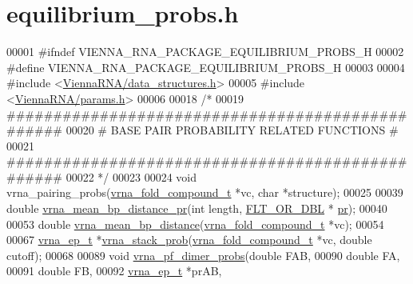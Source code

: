 \hypertarget{equilibrium__probs_8h_source}{}\section{equilibrium\+\_\+probs.\+h}
\label{equilibrium__probs_8h_source}

\begin{DoxyCode}
00001 \textcolor{preprocessor}{#ifndef VIENNA\_RNA\_PACKAGE\_EQUILIBRIUM\_PROBS\_H}
00002 \textcolor{preprocessor}{#define VIENNA\_RNA\_PACKAGE\_EQUILIBRIUM\_PROBS\_H}
00003 
00004 \textcolor{preprocessor}{#include <\hyperlink{data__structures_8h}{ViennaRNA/data\_structures.h}>}
00005 \textcolor{preprocessor}{#include <\hyperlink{params_8h}{ViennaRNA/params.h}>}
00006 
00018 \textcolor{comment}{/*}
00019 \textcolor{comment}{#################################################}
00020 \textcolor{comment}{# BASE PAIR PROBABILITY RELATED FUNCTIONS       #}
00021 \textcolor{comment}{#################################################}
00022 \textcolor{comment}{*/}
00023 
00024 \textcolor{keywordtype}{void}  vrna\_pairing\_probs(\hyperlink{group__fold__compound_structvrna__fc__s}{vrna\_fold\_compound\_t} *vc, \textcolor{keywordtype}{char} *structure);
00025 
00039 \textcolor{keywordtype}{double} \hyperlink{group__pf__fold_gad3f0c240512e6d43e2e4d4c2076021f5}{vrna\_mean\_bp\_distance\_pr}(\textcolor{keywordtype}{int} length, \hyperlink{group__data__structures_ga31125aeace516926bf7f251f759b6126}{FLT\_OR\_DBL} *
      \hyperlink{fold__vars_8h_ac98ec419070aee6831b44e5c700f090f}{pr});
00040 
00053 \textcolor{keywordtype}{double} \hyperlink{group__pf__fold_gaa6b8983b559b9ef4b2e1b31113ea317b}{vrna\_mean\_bp\_distance}(\hyperlink{group__fold__compound_structvrna__fc__s}{vrna\_fold\_compound\_t} *vc);
00054 
00067 \hyperlink{group__struct__utils_structvrna__elem__prob__s}{vrna\_ep\_t} *\hyperlink{group__pf__fold_ga132664bf29fdc30bb5ea715491d1ab22}{vrna\_stack\_prob}(\hyperlink{group__fold__compound_structvrna__fc__s}{vrna\_fold\_compound\_t} *vc, \textcolor{keywordtype}{double} 
      cutoff);
00068 
00089 \textcolor{keywordtype}{void}  \hyperlink{group__pf__cofold_gaa1e39e73afb51fbaf4ae38f0c066c46b}{vrna\_pf\_dimer\_probs}(\textcolor{keywordtype}{double}                  FAB,
00090                           \textcolor{keywordtype}{double}                  FA,
00091                           \textcolor{keywordtype}{double}                  FB,
00092                           \hyperlink{group__struct__utils_structvrna__elem__prob__s}{vrna\_ep\_t}               *prAB,

\end{DoxyCode}
